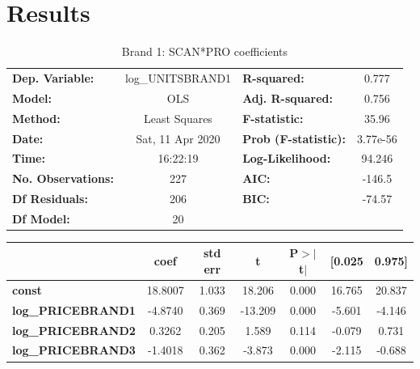 \documentclass[a4paper,11pt]{article}
\begin{document}
\section{Results}
\newpage
\begin{center}
\begin{table}
\caption{Brand 1: SCAN*PRO coefficients}
\begin{tabular}{lclc}

\toprule
\textbf{Dep. Variable:}        & log\_UNITSBRAND1 & \textbf{  R-squared:         } &     0.777   \\
\textbf{Model:}                &       OLS        & \textbf{  Adj. R-squared:    } &     0.756   \\
\textbf{Method:}               &  Least Squares   & \textbf{  F-statistic:       } &     35.96   \\
\textbf{Date:}                 & Sat, 11 Apr 2020 & \textbf{  Prob (F-statistic):} &  3.77e-56   \\
\textbf{Time:}                 &     16:22:19     & \textbf{  Log-Likelihood:    } &    94.246   \\
\textbf{No. Observations:}     &         227      & \textbf{  AIC:               } &    -146.5   \\
\textbf{Df Residuals:}         &         206      & \textbf{  BIC:               } &    -74.57   \\
\textbf{Df Model:}             &          20      & \textbf{                     } &             \\
\bottomrule
\end{tabular}
\end{table}
\begin{tabular}{lcccccc}
                               & \textbf{coef} & \textbf{std err} & \textbf{t} & \textbf{P$> |$t$|$} & \textbf{[0.025} & \textbf{0.975]}  \\
\midrule
\textbf{const}                 &      18.8007  &        1.033     &    18.206  &         0.000        &       16.765    &       20.837     \\
\textbf{log\_PRICEBRAND1}      &      -4.8740  &        0.369     &   -13.209  &         0.000        &       -5.601    &       -4.146     \\
\textbf{log\_PRICEBRAND2}      &       0.3262  &        0.205     &     1.589  &         0.114        &       -0.079    &        0.731     \\
\textbf{log\_PRICEBRAND3}      &      -1.4018  &        0.362     &    -3.873  &         0.000        &       -2.115    &       -0.688     \\

\end{tabular}
\end{center}
\end{document}
